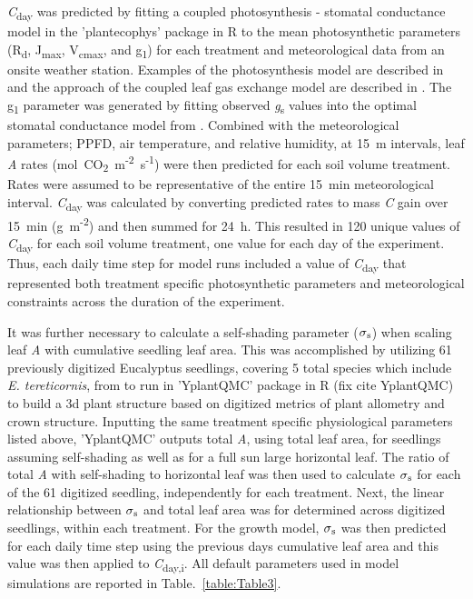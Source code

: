 \documentclass[a4paper]{article}\usepackage[]{graphicx}\usepackage[]{color}
\begin{document}
\textit{C}\textsubscript{day} was predicted by fitting a coupled photosynthesis - stomatal conductance model \citep{farquhar1980biochemical,medlyn2011reconciling} in the 'plantecophys' package in R \citep{Duursma2014} to the mean photosynthetic parameters (R\textsubscript{d}, J\textsubscript{max}, V\textsubscript{cmax}, and g\textsubscript{1}) for each treatment and meteorological data from an onsite weather station.  Examples of the photosynthesis model are described in \citet{medlyn2002temperature} and the approach of the coupled leaf gas exchange model are described in \citet{duursma2014peaked}. The g\textsubscript{1} parameter was generated by fitting observed \textit{g}\textsubscript{s} values into the optimal stomatal conductance model from \citep{medlyn2012reconciling}. Combined with the meteorological parameters; PPFD, air temperature, and relative humidity, at 15~m intervals, leaf \textit{A} rates ({\textmugreek}mol~CO\textsubscript{2}~m\textsuperscript{-2}~s\textsuperscript{-1}) were then predicted for each soil volume treatment. Rates were assumed to be representative of the entire 15~min meteorological interval. \textit{C}\textsubscript{day} was calculated by converting predicted rates to mass \textit{C} gain over 15~min (g~m\textsuperscript{-2}) and then summed for 24~h. This resulted in 120 unique values of \textit{C}\textsubscript{day} for each soil volume treatment, one value for each day of the experiment. Thus, each daily time step for model runs included a value of \textit{C}\textsubscript{day} that represented both treatment specific photosynthetic parameters and meteorological constraints across the duration of the experiment. 

It was further necessary to calculate a self-shading parameter ($\sigma\textsubscript{s}$) when scaling leaf \textit{A} with cumulative seedling leaf area. This was accomplished by utilizing 61 previously digitized Eucalyptus seedlings, covering 5 total species which include \textit{E. tereticornis}, from \citet{duursma2012light} to run in 'YplantQMC' package in R (fix cite YplantQMC) to build a 3d plant structure based on digitized metrics of plant allometry and crown structure. Inputting the same treatment specific physiological parameters listed above, 'YplantQMC' outputs total \textit{A}, using total leaf area, for seedlings assuming self-shading as well as for a full sun large horizontal leaf.  The ratio of total \textit{A} with self-shading to horizontal leaf was then used to calculate $\sigma\textsubscript{s}$ for each of the 61 digitized seedling, independently for each treatment. Next, the linear relationship between $\sigma\textsubscript{s}$ and total leaf area was for determined across digitized seedlings, within each treatment. For the growth model, $\sigma\textsubscript{s}$ was then predicted for each daily time step using the previous days cumulative leaf area and this value  was then applied to \textit{C}\textsubscript{day,i}. All default parameters used in model simulations are reported in Table.~\ref{table:Table3}.
\end{document}
